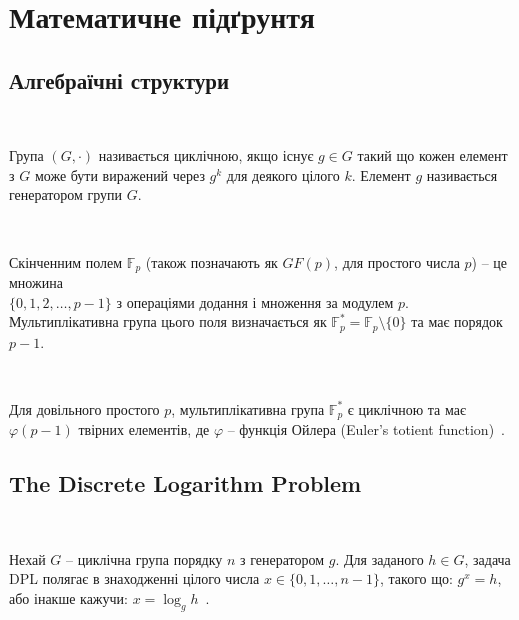 \section{Математичне підґрунтя}

\subsection{Алгебраїчні структури}

\begin{definition}
    ~\par Група $(G, \cdot)$ називається циклічною, якщо існує $g \in G$ такий що кожен елемент з $G$ може бути виражений через 
    $g^{k}$ для деякого цілого $k$. Елемент $g$ називається генератором групи $G$.
\end{definition}

\begin{definition}
    ~\par Скінченним полем $\mathbb{F}_{p}$ (також позначають як $GF(p)$, для простого числа $p$) -- це множина \\ 
    $\{0, 1, 2, \ldots, p-1\}$ з операціями додання і множення за модулем $p$. Мультиплікативна група цього поля 
    визначається як $\mathbb{F}_{p}^{*} = \mathbb{F}_{p} \setminus \{0\}$ та має порядок $p-1$.
\end{definition}

\begin{theorem}
    ~\par Для довільного простого $p$, мультиплікативна група $\mathbb{F}_{p}^{*}$ є циклічною та має $\varphi(p-1)$ твірних елементів, 
    де $\varphi$ -- функція Ойлера (Euler's totient function)~\cite{rosen2011elementary}.
\end{theorem}

\subsection{The Discrete Logarithm Problem}

\begin{definition}
    ~\par Нехай $G$ -- циклічна група порядку $n$ з генератором $g$. Для заданого $h \in G$, задача DPL полягає в знаходженні 
    цілого числа $x \in \{0, 1, \ldots, n-1\}$, такого що: $g^{x} = h$, або інакше кажучи: $x = \log_{g} h$~\cite{menezes1996handbook}.
\end{definition}

